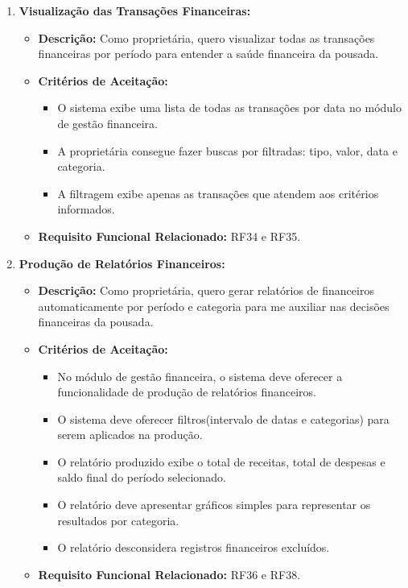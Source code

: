 \documentclass[
	12pt,				%
	openany,			%
	oneside,			%
	a4paper,			%
	english,			%
	french,				%
	spanish,			%
	brazil				%
	]{abntex2}
\begin{document}
\begin{enumerate}[label=\textbf{\arabic*.}]
\begin{itemize}
	\end{itemize} 
	\item \textbf{Visualização das Transações Financeiras:}
	\begin{itemize}
		\item \textbf{Descrição:} Como proprietária, quero visualizar todas as transações financeiras por período para entender a saúde financeira da pousada.
		\item \textbf{Critérios de Aceitação:}
		\begin{itemize}
			\item O sistema exibe uma lista de todas as transações por data no módulo de gestão financeira.
			\item A proprietária consegue fazer buscas por filtradas: tipo, valor, data e categoria.
			\item A filtragem exibe apenas as transações que atendem aos critérios informados.
		\end{itemize}
		\item \textbf{Requisito Funcional Relacionado:} RF34 e RF35.
	\end{itemize} 
	\item \textbf{Produção de Relatórios Financeiros:}
	\begin{itemize}
		\item \textbf{Descrição:} Como proprietária, quero gerar relatórios de financeiros automaticamente por período e categoria para me auxiliar nas decisões financeiras da pousada.
		\item \textbf{Critérios de Aceitação:}
		\begin{itemize}
			\item No módulo de gestão financeira, o sistema deve oferecer a funcionalidade de produção de relatórios financeiros.
			\item O sistema deve oferecer filtros(intervalo de datas e categorias) para serem aplicados na produção.
			\item O relatório produzido exibe o total de receitas, total de despesas e saldo final do período selecionado.
			\item O relatório deve apresentar gráficos simples para representar os resultados por categoria.
			\item O relatório desconsidera registros financeiros excluídos.
		\end{itemize}
		\item \textbf{Requisito Funcional Relacionado:} RF36 e RF38.
	\end{itemize} 

\end{enumerate}
\end{document}
